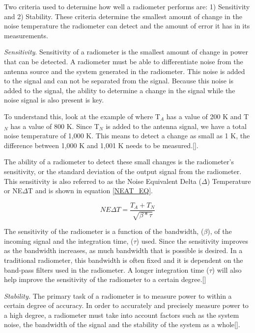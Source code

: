 Two criteria used to determine how well a radiometer performs are: 1) Sensitivity and 2) Stability.  These criteria determine the smallest amount of change in the noise temperature the radiometer can detect and the amount of error it has in its measurements.

\emph{Sensitivity}.  Sensitivity of a radiometer is the smallest amount of change in power that can be detected.  A radiometer must be able to differentiate noise from the antenna source and the system generated in the radiometer.  This noise is added to the signal and can not be separated from the signal.  Because this noise is added to the signal, the ability to determine a change in the signal while the noise signal is also present is key.  

To understand this, look at the example of where T$_{A}$ has a value of 200 K and T$_{N}$ has a value of 800 K.  Since T$_{N}$ is added to the antenna signal, we have a total noise temperature of 1,000 K.  This means to detect a change as small as 1 K, the difference between 1,000 K and 1,001 K needs to be measured.[\cite{skou}].

The ability of a radiometer to detect these small changes is the radiometer's sensitivity, or the standard deviation of the output signal from the radiometer.  This sensitivity is also referred to as the Noise Equivalent Delta ($\Delta$) Temperature or NE$\Delta$T and is shown in equation \ref{NEAT_EQ}. 

\begin{equation} \label{NEAT_EQ}
NE\Delta T=\frac{T_{A}+T_{N}}{\sqrt{\beta * \tau}} 
\end{equation}

The sensitivity of the radiometer is a function of the bandwidth, ($\beta$), of the incoming signal and the integration time, ($\tau$) used.  Since the sensitivity improves as the bandwidth increases, as much bandwidth that is possible is desired.  In a traditional radiometer, this bandwidth is often fixed and it is dependent on the band-pass filters used in the radiometer.  A longer integration time ($\tau$) will also help improve the sensitivity of the radiometer to a certain degree.[\cite{ulaby}]

\emph{Stability.}  The primary task of a radiometer is to measure power to within a certain degree of accuracy.  In order to accurately and precisely measure power to a high degree, a radiometer must take into account factors such as the system noise, the bandwidth of the signal and the stability of the system as a whole[\cite{Evans}]. 

